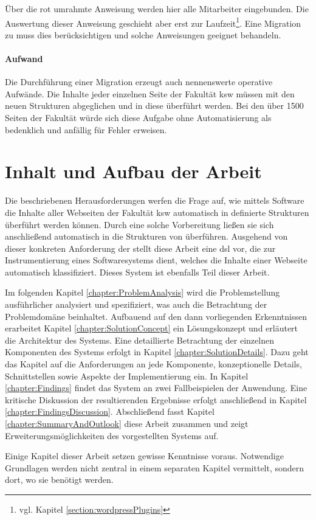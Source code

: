         Über die rot umrahmte Anweisung werden hier alle Mitarbeiter eingebunden.
        Die Auswertung dieser Anweisung geschieht aber erst zur
        Laufzeit\footnote{vgl. Kapitel \ref{section:wordpressPlugins}}.
        Eine Migration zu {\imperia} muss dies berücksichtigen und solche Anweisungen
        geeignet behandeln.

        \paragraph{Aufwand}
        Die Durchführung einer Migration erzeugt auch nennenswerte operative Aufwände.
        Die Inhalte jeder einzelnen Seite der Fakultät \gls{ksw} müssen
        mit den neuen Strukturen abgeglichen und in diese überführt werden.
        Bei den über 1500 Seiten der Fakultät
        würde sich diese Aufgabe ohne Automatisierung als bedenklich und anfällig für Fehler erweisen.

    \section{Inhalt und Aufbau der Arbeit}
        Die beschriebenen Herausforderungen
        werfen die Frage auf, wie mittels Software die Inhalte aller Webseiten der Fakultät \gls{ksw}
        automatisch in definierte Strukturen überführt werden können.
        Durch eine solche Vorbereitung ließen sie sich anschließend
        automatisch in die Strukturen von {\imperia} überführen.
        Ausgehend von dieser konkreten Anforderung der {\fernUni} stellt diese Arbeit eine
        \gls{dsl} vor, die zur Instrumentierung eines Softwaresystems dient,
        welches die Inhalte einer Webseite automatisch klassifiziert.
        Dieses System ist ebenfalls Teil dieser Arbeit.

        Im folgenden Kapitel \ref{chapter:ProblemAnalysis} wird die Problemstellung ausführlicher
        analysiert und spezifiziert, was auch die Betrachtung der Problemdomäne beinhaltet.
        Aufbauend auf den dann vorliegenden Erkenntnissen erarbeitet
        Kapitel \ref{chapter:SolutionConcept}
        ein Lösungskonzept und erläutert die Architektur des Systems.
        Eine detaillierte Betrachtung der einzelnen Komponenten des Systems
        erfolgt in Kapitel \ref{chapter:SolutionDetails}.
        Dazu geht das Kapitel auf die Anforderungen an jede Komponente,
        konzeptionelle Details, Schnittstellen sowie Aspekte der Implementierung ein.       
        In Kapitel \ref{chapter:Findings} findet das System an zwei Fallbeispielen der {\fernUni}
        Anwendung.
        Eine kritische Diskussion der resultierenden Ergebnisse erfolgt anschließend in
        Kapitel \ref{chapter:FindingsDiscussion}.
        Abschließend fasst Kapitel \ref{chapter:SummaryAndOutlook}
        diese Arbeit zusammen und zeigt Erweiterungsmöglichkeiten
        des vorgestellten Systems auf.

        Einige Kapitel dieser Arbeit setzen gewisse Kenntnisse voraus.
        Notwendige Grundlagen werden nicht zentral in einem separaten Kapitel vermittelt,
        sondern dort, wo sie benötigt werden.

